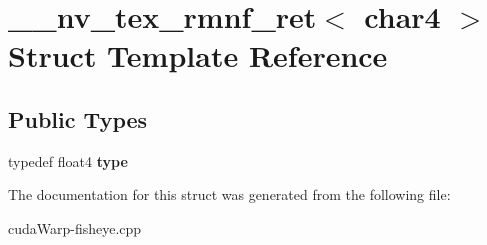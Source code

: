 \hypertarget{struct____nv__tex__rmnf__ret_3_01char4_01_4}{}\section{\+\_\+\+\_\+nv\+\_\+tex\+\_\+rmnf\+\_\+ret$<$ char4 $>$ Struct Template Reference}
\label{struct____nv__tex__rmnf__ret_3_01char4_01_4}
\subsection*{Public Types}
\begin{DoxyCompactItemize}
\item 
typedef float4 {\bfseries type}\hypertarget{struct____nv__tex__rmnf__ret_3_01char4_01_4_a26d5d95ba36f757bea850872475b60c2}{}\label{struct____nv__tex__rmnf__ret_3_01char4_01_4_a26d5d95ba36f757bea850872475b60c2}

\end{DoxyCompactItemize}


The documentation for this struct was generated from the following file\+:\begin{DoxyCompactItemize}
\item 
cuda\+Warp-\/fisheye.\+cpp\end{DoxyCompactItemize}
